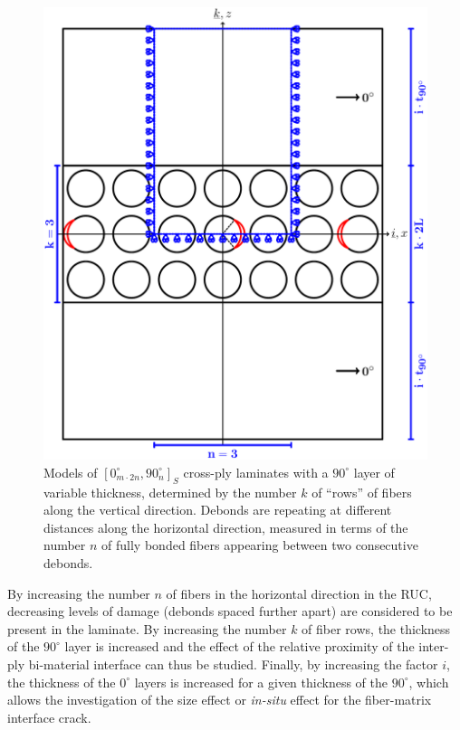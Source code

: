 \documentclass[review]{elsarticle}
\begin{document}
\begin{figure}[!h]
\centering
        \includegraphics[width=\textwidth]{ThickPly.pdf}
\caption{Models of $\left[0_{m\cdot2n}^{\circ},90_{n}^{\circ}\right]_{S}$ cross-ply laminates with a $90^{\circ}$ layer of variable thickness, determined by the number $k$ of ``rows'' of fibers along the vertical direction.  Debonds are repeating at different distances along the horizontal direction, measured in terms of the number $n$ of fully bonded fibers appearing between two consecutive debonds.}\label{fig:laminateModelsB}
\end{figure}

By increasing the number $n$ of fibers in the horizontal direction in the RUC, decreasing levels of damage (debonds spaced further apart) are considered to be present in the laminate. By increasing the number $k$ of fiber rows, the thickness of the $90^{\circ}$ layer is increased and the effect of the relative proximity of the inter-ply bi-material interface can thus be studied. Finally, by increasing the factor $i$, the thickness of the $0^{\circ}$ layers is increased for a given thickness of the $90^{\circ}$, which allows the investigation of the size effect or \emph{in-situ} effect for the fiber-matrix interface crack.
\end{document}
